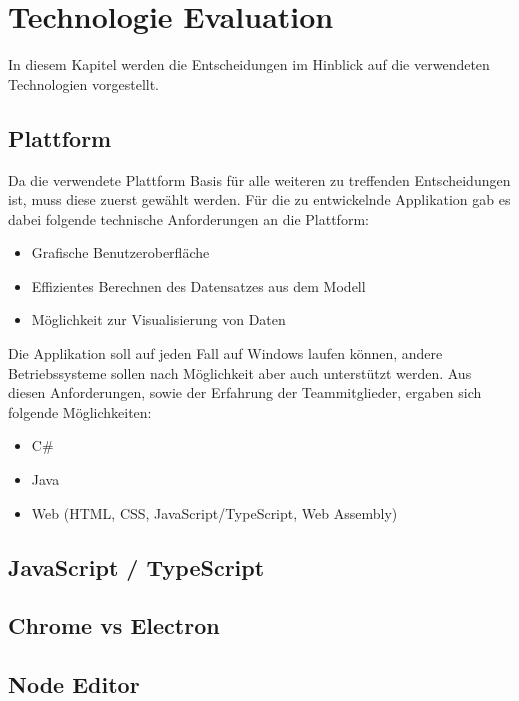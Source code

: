 
\chapter{Technologie Evaluation}

In diesem Kapitel werden die Entscheidungen im Hinblick auf die verwendeten Technologien vorgestellt.

\section{Plattform}

Da die verwendete Plattform Basis für alle weiteren zu treffenden Entscheidungen ist, muss diese zuerst gewählt werden. Für die zu entwickelnde Applikation gab es dabei folgende technische Anforderungen an die Plattform:

\begin{itemize}
    \item Grafische Benutzeroberfläche
    \item Effizientes Berechnen des Datensatzes aus dem Modell
    \item Möglichkeit zur Visualisierung von Daten
\end{itemize}

Die Applikation soll auf jeden Fall auf Windows laufen können, andere Betriebssysteme sollen nach Möglichkeit aber auch unterstützt werden. Aus diesen Anforderungen, sowie der Erfahrung der Teammitglieder, ergaben sich folgende Möglichkeiten:
\begin{itemize}
    \item C\#
    \item Java
    \item Web (HTML, CSS, JavaScript/TypeScript, Web Assembly)
\end{itemize}

\section{JavaScript / TypeScript}

\section{Chrome vs Electron}

\section{Node Editor}

